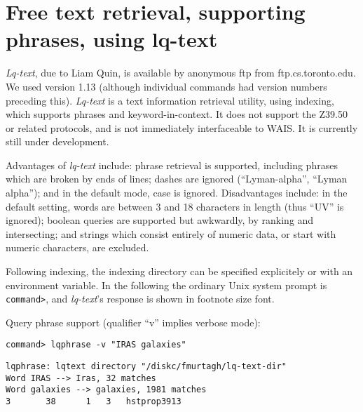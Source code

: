 \section{Free text retrieval, supporting phrases, using lq-text}

{\it Lq-text}, due to Liam Quin, 
 is available by anonymous ftp from
ftp.cs.toronto.edu.  We used version 1.13 (although individual
commands had version numbers preceding this).  {\it Lq-text} is a text
information retrieval utility, using indexing,  which 
supports phrases and keyword-in-context.
It does not support the Z39.50 or related protocols, and is not 
immediately interfaceable to WAIS.  It is currently  still under development.

Advantages of {\it lq-text} include: phrase retrieval is supported,
including phrases which are broken by ends of lines; dashes are 
ignored (``Lyman-alpha'', ``Lyman alpha''); and in the default 
mode, case is ignored.  Disadvantages include: in the default
setting, words are between 3 and 18 characters in length (thus
``UV'' is ignored); boolean queries are supported but 
awkwardly, by ranking and intersecting; and strings which consist
entirely of numeric data, or start with numeric characters, are
excluded. 

Following indexing, the indexing directory can be specified explicitely or
with an environment variable. 
In the following
the ordinary Unix system prompt is {\tt command>}, and 
{\it lq-text}'s response is shown in footnote size font.

%
%

Query phrase support (qualifier ``v'' implies verbose mode):

\begin{verbatim}
command> lqphrase -v "IRAS galaxies"

\end{verbatim}

\begin{footnotesize}
\begin{verbatim}
lqphrase: lqtext directory "/diskc/fmurtagh/lq-text-dir"
Word IRAS --> Iras, 32 matches
Word galaxies --> galaxies, 1981 matches
3       38      1   3   hstprop3913
\end{verbatim}
\end{footnotesize}

